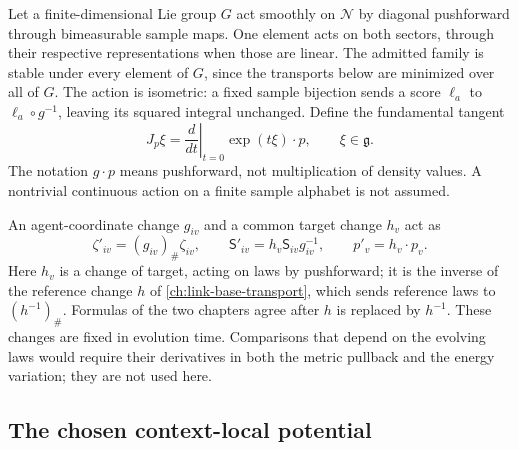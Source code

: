 Let a finite-dimensional Lie group $G$ act smoothly on $\mathcal N$ by diagonal pushforward through bimeasurable sample maps. One element acts on both sectors, through their respective representations when those are linear. The admitted family is stable under every element of $G$, since the transports below are minimized over all of $G$. The action is isometric: a fixed sample bijection sends a score $\ell_a$ to $\ell_a\circ g^{-1}$, leaving its squared integral unchanged. Define the fundamental tangent
\begin{equation}
 J_p\xi=\left.\frac{d}{dt}\right|_{t=0}\exp(t\xi)\cdot p,
 \qquad \xi\in\mathfrak g.
 \label{ctx:f:eq:J}
\end{equation}
The notation $g\cdot p$ means pushforward, not multiplication of density values. A nontrivial continuous action on a finite sample alphabet is not assumed.

An agent-coordinate change $g_{iv}$ and a common target change $h_v$ act as
\begin{equation}
 \zeta'_{iv}=(g_{iv})_\#\zeta_{iv},\qquad
 \mathsf S'_{iv}=h_v\mathsf S_{iv}g_{iv}^{-1},\qquad
 p'_v=h_v\cdot p_v.
 \label{ctx:f:eq:comparisons}
\end{equation}
Here $h_v$ is a change of target, acting on laws by pushforward; it is the inverse of the reference change $h$ of \cref{ch:link-base-transport}, which sends reference laws to $(h^{-1})_\#$. Formulas of the two chapters agree after $h$ is replaced by $h^{-1}$. These changes are fixed in evolution time. Comparisons that depend on the evolving laws would require their derivatives in both the metric pullback and the energy variation; they are not used here.

\subsection{The chosen context-local potential}

